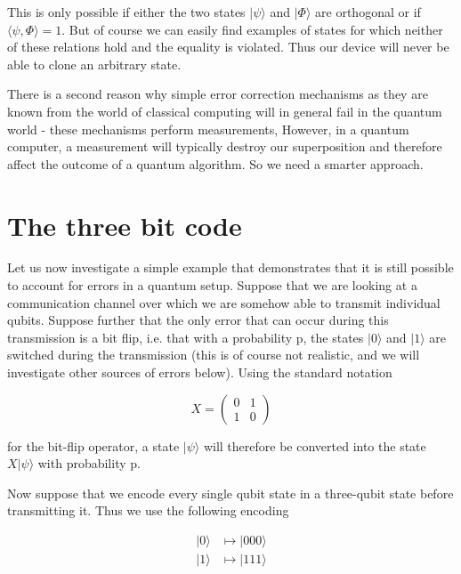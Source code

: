 \documentclass[a4paper, draft]{article}
\theoremstyle{own}
\theoremstyle{remark}
\begin{document}
This is only possible if either the two states $|\psi \rangle$ and $|\Phi \rangle$ are orthogonal or if $\langle \psi, \Phi \rangle = 1$. But of course we can easily find examples of states for which neither of these relations hold and the equality is violated. Thus our device will never be able to clone an arbitrary state. 

There is a second reason why simple error correction mechanisms as they are known from the world of classical computing will in general fail in the quantum world - these mechanisms perform measurements, However, in a quantum computer, a measurement will typically destroy our superposition and therefore affect the outcome of a quantum algorithm. So we need a smarter approach. 

\section{The three bit code}

Let us now investigate a simple example that demonstrates that it is still possible to account for errors in a quantum setup. Suppose that we are looking at a communication channel over which we are somehow able to transmit individual qubits. Suppose further that the only error that can occur during this transmission is a bit flip, i.e. that with a probability p, the states $|0 \rangle$ and $|1 \rangle$ are switched during the transmission (this is of course not realistic, and we will investigate other sources of errors below). Using the standard notation

$$
X = \begin{pmatrix} 0 & 1 \\ 1 & 0\end{pmatrix}
$$

for the bit-flip operator, a state $| \psi \rangle$ will therefore be converted into the state $X |\psi \rangle$ with probability p. 

Now suppose that we encode every single qubit state in a three-qubit state before transmitting it. Thus we use the following encoding

\begin{align*}
|0 \rangle & \mapsto |000 \rangle \\
|1 \rangle & \mapsto |111 \rangle \\
\end{align*}
\end{document}
